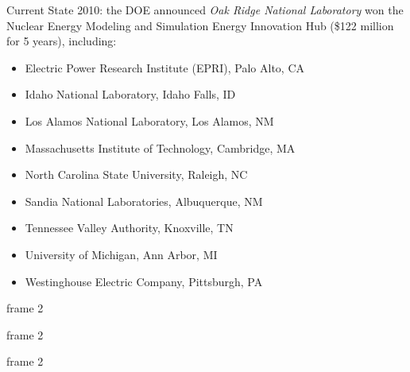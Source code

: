 \documentclass[xcolor=x11names,compress]{beamer}
\renewcommand{\(}{\begin{columns}}
\renewcommand{\)}{\end{columns}}
\newcommand{\<}[1]{\begin{column}{#1}}
\renewcommand{\>}{\end{column}}
\begin{document}
\begin{frame}{Current State}
2010: the DOE announced \emph{Oak Ridge National Laboratory} won the Nuclear Energy Modeling and Simulation Energy Innovation Hub (\$122 million for 5 years), including:	
\begin{itemize}
\item Electric Power Research Institute (EPRI), Palo Alto, CA
\item Idaho National Laboratory, Idaho Falls, ID
\item Los Alamos National Laboratory, Los Alamos, NM
\item Massachusetts Institute of Technology, Cambridge, MA
\item North Carolina State University, Raleigh, NC
\item Sandia National Laboratories, Albuquerque, NM
\item Tennessee Valley Authority, Knoxville, TN
\item University of Michigan, Ann Arbor, MI
\item Westinghouse Electric Company, Pittsburgh, PA
\end{itemize}
\end{frame}

\begin{frame}{frame 2}

\end{frame}

\begin{frame}{frame 2}

\end{frame}

\begin{frame}{frame 2}

\end{frame}
\end{document}
